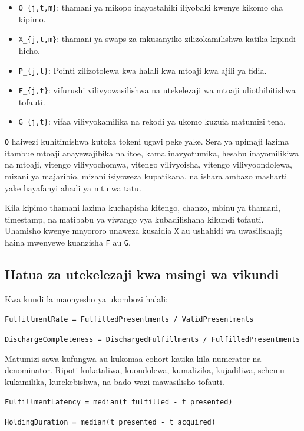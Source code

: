 \documentclass[11pt]{article}
\begin{document}
\begin{itemize}[leftmargin=*]
\item \texttt{O\_\{j,t,m\}}: thamani ya mikopo inayostahiki iliyobaki kwenye kikomo cha kipimo.
\item \texttt{X\_\{j,t,m\}}: thamani ya swaps za mkusanyiko zilizokamilishwa katika kipindi hicho.
\item \texttt{P\_\{j,t\}}: Pointi zilizotolewa kwa halali kwa mtoaji kwa ajili ya fidia.
\item \texttt{F\_\{j,t\}}: vifurushi vilivyowasilishwa na utekelezaji wa mtoaji uliothibitishwa tofauti.
\item \texttt{G\_\{j,t\}}: vifaa vilivyokamilika na rekodi ya ukomo kuzuia matumizi tena.
\end{itemize}
\texttt{O} haiwezi kuhitimishwa kutoka tokeni ugavi peke yake. Sera ya upimaji lazima itambue mtoaji anayewajibika na itoe, kama inavyotumika, hesabu inayomilikiwa na mtoaji, vitengo vilivyochomwa, vitengo vilivyoisha, vitengo vilivyoondolewa, mizani ya majaribio, mizani isiyoweza kupatikana, na ishara ambazo masharti yake hayafanyi ahadi ya mtu wa tatu.

Kila kipimo thamani lazima kuchapisha kitengo, chanzo, mbinu ya thamani, timestamp, na matibabu ya viwango vya kubadilishana kikundi tofauti. Uhamisho kwenye mnyororo unaweza kusaidia \texttt{X} au ushahidi wa uwasilishaji; haina mwenyewe kuanzisha \texttt{F} au \texttt{G}.

\subsection*{Hatua za utekelezaji kwa msingi wa vikundi}

Kwa kundi la maonyesho ya ukombozi halali:

\texttt{FulfillmentRate = FulfilledPresentments / ValidPresentments}

\texttt{DischargeCompleteness = DischargedFulfillments / FulfilledPresentments}

Matumizi sawa kufungwa au kukomaa cohort katika kila numerator na denominator. Ripoti kukataliwa, kuondolewa, kumalizika, kujadiliwa, sehemu kukamilika, kurekebishwa, na bado wazi mawasilisho tofauti.

\texttt{FulfillmentLatency = median(t\_fulfilled - t\_presented)}

\texttt{HoldingDuration = median(t\_presented - t\_acquired)}
\end{document}
